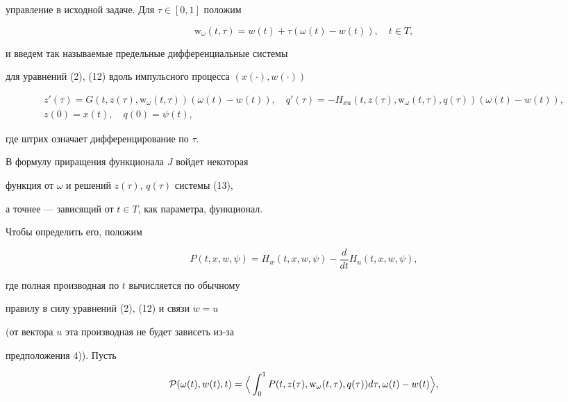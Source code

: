 управление в исходной задаче. Для $\tau \in[0,1]$ положим


$$


{\mathrm w}_\omega(t,\tau)=w(t)+\tau(\omega(t)-w(t)), \quad t\in T,


$$


и введем так называемые предельные дифференциальные системы


для уравнений (2), (12) вдоль импульсного процесса $(x(\cdot),w(\cdot))$


\begin{equation}


\begin{array}{c}


z'(\tau)=G(t,z(\tau),{\mathrm w}_\omega(t,\tau))(\omega(t)-w(t)),\quad


q'(\tau)=-H_{xu}(t,z(\tau),{\mathrm w}_\omega


(t,\tau),q(\tau))(\omega(t)-w(t)), \\[2mm]


z(0)=x(t),\quad q(0)=\psi(t),


\end{array}


\end{equation}


где штрих означает дифференцирование по $\tau$.





В формулу приращения функционала $J$ войдет некоторая


функция от $\omega$ и решений $z(\tau)$, $q(\tau)$ системы (13), 


а точнее --- зависящий от $t\in T$, как параметра, функционал.


Чтобы определить его, положим


\begin{equation}


P(t,x,w,\psi)=H_w(t,x,w,\psi)-\frac{d}{dt}H_u(t,x,w,\psi),


\end{equation}


где полная производная по $t$ вычисляется по обычному 


правилу в силу уравнений (2), (12) и связи $\Dot{w}=u$ 


(от вектора $u$ эта производная не будет зависеть из-за 


предположения 4)). Пусть


\begin{equation}


{\cal P} (\omega(t),w(t),t)=\Big\langle \int_0^1P(t,z(\tau),{\mathrm w}_\omega


(t,\tau),q(\tau))d\tau, \omega(t)-w(t)\Big\rangle,


\end{equation}



